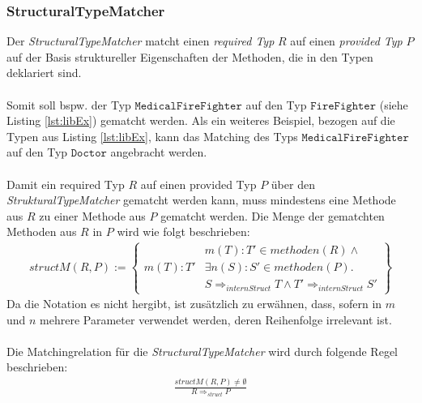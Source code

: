 \documentclass[a4paper,12pt]{article}
\begin{document}
\subsubsection{StructuralTypeMatcher} 
Der \emph{StructuralTypeMatcher} matcht einen \emph{required Typ} $R$ auf einen \emph{provided Typ} $P$ auf der Basis struktureller Eigenschaften der Methoden, die in den Typen deklariert sind. 
\\\\
Somit soll bspw. der Typ $\texttt{MedicalFireFighter}$ auf den Typ $\texttt{FireFighter}$ (siehe Listing \ref{lst:libEx}) gematcht werden. Als ein weiteres Beispiel, bezogen auf die Typen aus Listing \ref{lst:libEx}, kann das Matching des Typs $\texttt{MedicalFireFighter}$ auf den Typ $\texttt{Doctor}$ angebracht werden.
\\\\
Damit ein required Typ $R$ auf einen provided Typ $P$ über den \emph{StrukturalTypeMatcher} gematcht werden kann, muss mindestens eine Methode aus $R$ zu einer Methode aus $P$ gematcht werden. Die Menge der gematchten Methoden aus $R$ in $P$ wird wie folgt beschrieben:
\begin{gather*}
structM(R,P) := \left\{ 
				\begin{array}{l|l}
				& m(T):T' \in methoden(R) \wedge \mathit{ }\\
m(T):T'						& \exists n(S):S' \in methoden(P) .\\								 &  S\Rightarrow_{internStruct}T \wedge T' \Rightarrow_{internStruct}S' 
				\end{array}
              \right\}
\end{gather*}
Da die Notation es nicht hergibt, ist zusätzlich zu erwähnen, dass, sofern in $m$ und $n$ mehrere Parameter verwendet werden, deren Reihenfolge irrelevant ist.\\\\
Die Matchingrelation für die \emph{StructuralTypeMatcher} wird durch folgende Regel beschrieben:
\begin{gather*}
\frac{structM(R,P) \neq \emptyset}{R \Rightarrow_{struct}P}
\end{gather*}
\end{document}

